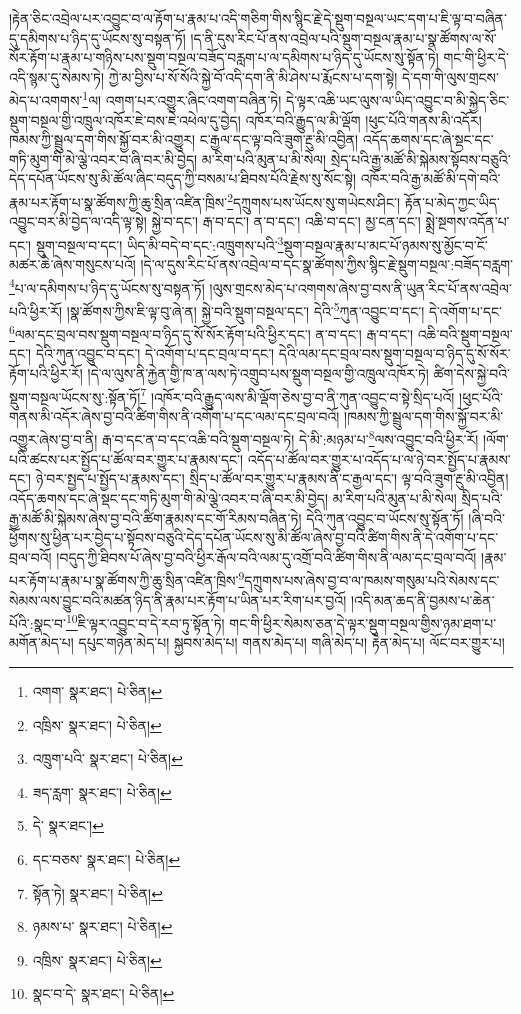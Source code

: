 །རྟེན་ཅིང་འབྲེལ་པར་འབྱུང་བ་ལ་རྟོག་པ་རྣམ་པ་འདི་གཅིག་གིས་སྙིང་རྗེ་དེ་སྡུག་བསྔལ་ཡང་དག་པ་ཇི་ལྟ་བ་བཞིན་དུ་དམིགས་པ་ཉིད་དུ་ཡོངས་སུ་བསྟན་ཏོ། །ད་ནི་དུས་རིང་པོ་ནས་འབྲེལ་པའི་སྡུག་བསྔལ་རྣམ་པ་སྣ་ཚོགས་ལ་སོ་སོར་རྟོག་པ་རྣམ་པ་གཉིས་པས་སྡུག་བསྔལ་བཟོད་བརླག་པ་ལ་དམིགས་པ་ཉིད་དུ་ཡོངས་སུ་སྟོན་ཏེ། གང་གི་ཕྱིར་དེ་འདི་སྙམ་དུ་སེམས་ཏེ། ཀྱེ་མ་བྱིས་པ་སོ་སོའི་སྐྱེ་བོ་འདི་དག་ནི་མི་ཤེས་པ་རྨོངས་པ་དག་སྟེ། དེ་དག་གི་ལུས་གྲངས་མེད་པ་འགགས་\footnote{འགག་  སྣར་ཐང་།  པེ་ཅིན། }ལ། འགག་པར་འགྱུར་ཞིང་འགག་བཞིན་ཏེ། དེ་ལྟར་འཆི་ཡང་ལུས་ལ་ཡིད་འབྱུང་བ་མི་སྐྱེད་ཅིང་སྡུག་བསྔལ་གྱི་འཁྲུལ་འཁོར་ཇེ་བས་ཇེ་འཕེལ་དུ་བྱེད། འཁོར་བའི་རྒྱུད་ལ་མི་ལྡོག །ཕུང་པོའི་གནས་མི་འདོར། ཁམས་ཀྱི་སྦྲུལ་དག་གིས་སྐྱོ་བར་མི་འགྱུར། ང་རྒྱལ་དང་ལྟ་བའི་ཟུག་རྔུ་མི་འབྱིན། འདོད་ཆགས་དང་ཞེ་སྡང་དང་གཏི་མུག་གི་མེ་ལྕེ་འབར་བ་ཞི་བར་མི་བྱེད། མ་རིག་པའི་མུན་པ་མི་སེལ། སྲེད་པའི་རྒྱ་མཚོ་མི་སྐེམས་སྟོབས་བཅུའི་དེད་དཔོན་ཡོངས་སུ་མི་ཚོལ་ཞིང་བདུད་ཀྱི་བསམ་པ་ཐིབས་པོའི་རྗེས་སུ་སོང་སྟེ། འཁོར་བའི་རྒྱ་མཚོ་མི་དགེ་བའི་རྣམ་པར་རྟོག་པ་སྣ་ཚོགས་ཀྱི་ཆུ་སྲིན་འཛིན་ཁྲིས་\footnote{འཁྲིས་  སྣར་ཐང་།  པེ་ཅིན། }དཀྲུགས་པས་ཡོངས་སུ་གཡེངས་ཤིང་། རྟོན་པ་མེད་ཀྱང་ཡིད་འབྱུང་བར་མི་བྱེད་ལ་འདི་ལྟ་སྟེ། སྐྱེ་བ་དང་། རྒ་བ་དང་། ན་བ་དང་། འཆི་བ་དང་། མྱ་ངན་དང་། སྨྲེ་སྔགས་འདོན་པ་དང་། སྡུག་བསྔལ་བ་དང་། ཡིད་མི་བདེ་བ་དང་:འཁྲུགས་པའི་\footnote{འཁྲུག་པའི་  སྣར་ཐང་།  པེ་ཅིན། }སྡུག་བསྔལ་རྣམ་པ་མང་པོ་ཉམས་སུ་མྱོང་བ་ངོ་མཚར་ཆེ་ཞེས་གསུངས་པའོ། །དེ་ལ་དུས་རིང་པོ་ནས་འབྲེལ་བ་དང་སྣ་ཚོགས་ཀྱིས་སྙིང་རྗེ་སྡུག་བསྔལ་:བཟོད་བརླག་\footnote{ཟད་རླག་  སྣར་ཐང་།  པེ་ཅིན། }པ་ལ་དམིགས་པ་ཉིད་དུ་ཡོངས་སུ་བསྟན་ཏོ། །ལུས་གྲངས་མེད་པ་འགགས་ཞེས་བྱ་བས་ནི་ཡུན་རིང་པོ་ནས་འབྲེལ་པའི་ཕྱིར་རོ། །སྣ་ཚོགས་ཀྱིས་ཇི་ལྟ་བུ་ཞེ་ན། སྐྱེ་བའི་སྡུག་བསྔལ་དང་། དེའི་\footnote{དེ་  སྣར་ཐང་། }ཀུན་འབྱུང་བ་དང་། དེ་འགོག་པ་དང་\footnote{དང་བཅས་  སྣར་ཐང་།  པེ་ཅིན། }ལམ་དང་བྲལ་བས་སྡུག་བསྔལ་བ་ཉིད་དུ་སོ་སོར་རྟོག་པའི་ཕྱིར་དང་། ན་བ་དང་། རྒ་བ་དང་། འཆི་བའི་སྡུག་བསྔལ་དང་། དེའི་ཀུན་འབྱུང་བ་དང་། དེ་འགོག་པ་དང་བྲལ་བ་དང་། དེའི་ལམ་དང་བྲལ་བས་སྡུག་བསྔལ་བ་ཉིད་དུ་སོ་སོར་རྟོག་པའི་ཕྱིར་རོ། །དེ་ལ་ལུས་ནི་རྐྱེན་གྱི་ཁ་ན་ལས་ཏེ་འགྲུབ་པས་སྡུག་བསྔལ་གྱི་འཁྲུལ་འཁོར་ཏེ། ཚིག་དེས་སྐྱེ་བའི་སྡུག་བསྔལ་ཡོངས་སུ་:སྟོན་ཏོ།\footnote{སྟོན་ཏེ།  སྣར་ཐང་།  པེ་ཅིན། } །འཁོར་བའི་རྒྱུད་ལས་མི་ལྡོག་ཅེས་བྱ་བ་ནི་ཀུན་འབྱུང་བ་སྟེ་སྲིད་པའོ། །ཕུང་པོའི་གནས་མི་འདོར་ཞེས་བྱ་བའི་ཚིག་གིས་ནི་འགོག་པ་དང་ལམ་དང་བྲལ་བའོ། །ཁམས་ཀྱི་སྦྲུལ་དག་གིས་སྐྱོ་བར་མི་འགྱུར་ཞེས་བྱ་བ་ནི། རྒ་བ་དང་ན་བ་དང་འཆི་བའི་སྡུག་བསྔལ་ཏེ། དེ་མི་:མཉམ་པ་\footnote{ཉམས་པ་  སྣར་ཐང་།  པེ་ཅིན། }ལས་འབྱུང་བའི་ཕྱིར་རོ། །ལོག་པའི་ཚངས་པར་སྤྱོད་པ་ཚོལ་བར་གྱུར་པ་རྣམས་དང་། འདོད་པ་ཚོལ་བར་གྱུར་པ་འདོད་པ་ལ་ཉེ་བར་སྤྱོད་པ་རྣམས་དང་། ཉེ་བར་སྤྱད་པ་སྤྱོད་པ་རྣམས་དང་། སྲིད་པ་ཚོལ་བར་གྱུར་པ་རྣམས་ནི་ང་རྒྱལ་དང་། ལྟ་བའི་ཟུག་རྔུ་མི་འབྱིན། འདོད་ཆགས་དང་ཞེ་སྡང་དང་གཏི་མུག་གི་མེ་ལྕེ་འབར་བ་ཞི་བར་མི་བྱེད། མ་རིག་པའི་མུན་པ་མི་སེལ། སྲིད་པའི་རྒྱ་མཚོ་མི་སྐེམས་ཞེས་བྱ་བའི་ཚིག་རྣམས་དང་གོ་རིམས་བཞིན་ཏེ། དེའི་ཀུན་འབྱུང་བ་ཡོངས་སུ་སྟོན་ཏོ། །ཞི་བའི་ཕྱོགས་སུ་ཕྱིན་པར་བྱེད་པ་སྟོབས་བཅུའི་དེད་དཔོན་ཡོངས་སུ་མི་ཚོལ་ཞེས་བྱ་བའི་ཚིག་གིས་ནི་དེ་འགོག་པ་དང་བྲལ་བའོ། །བདུད་ཀྱི་ཐིབས་པོ་ཞེས་བྱ་བའི་ཕྱིར་རྒོལ་བའི་ལམ་དུ་འགྲོ་བའི་ཚིག་གིས་ནི་ལམ་དང་བྲལ་བའོ། །རྣམ་པར་རྟོག་པ་རྣམ་པ་སྣ་ཚོགས་ཀྱི་ཆུ་སྲིན་འཛིན་ཁྲིས་\footnote{འཁྲིས་  སྣར་ཐང་།  པེ་ཅིན། }དཀྲུགས་པས་ཞེས་བྱ་བ་ལ་ཁམས་གསུམ་པའི་སེམས་དང་སེམས་ལས་བྱུང་བའི་མཚན་ཉིད་ནི་རྣམ་པར་རྟོག་པ་ཡིན་པར་རིག་པར་བྱའོ། །འདི་མན་ཆད་ནི་བྱམས་པ་ཆེན་པོའི་:སྣང་བ་\footnote{སྣང་བ་དེ་  སྣར་ཐང་།  པེ་ཅིན། }ཇི་ལྟར་འབྱུང་བ་དེ་རབ་ཏུ་སྟོན་ཏེ། གང་གི་ཕྱིར་སེམས་ཅན་དེ་ལྟར་སྡུག་བསྔལ་གྱིས་ཉམ་ཐག་པ་མགོན་མེད་པ། དཔུང་གཉེན་མེད་པ། སྐྱབས་མེད་པ། གནས་མེད་པ། གཞི་མེད་པ། རྟེན་མེད་པ། ལོང་བར་གྱུར་པ། 